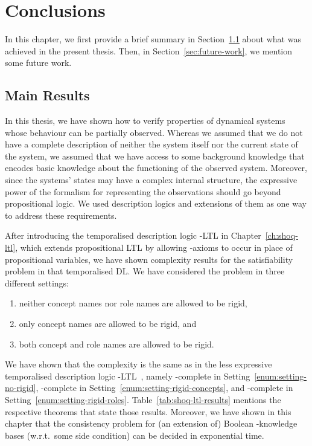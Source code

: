 \chapter{Conclusions}\label{ch:conclusions}

In this chapter, we first provide a brief summary in
Section~\ref{sec:main-results} about what was achieved in the present
thesis.  Then, in Section~\ref{sec:future-work}, we mention some future work.


\section{Main Results}\label{sec:main-results}

In this thesis, we have shown how to verify properties of dynamical systems
whose behaviour can be partially observed.  Whereas we assumed that we do not
have a complete description of neither the system itself nor the current state
of the system, we assumed that we have access to some background knowledge that
encodes basic knowledge about the functioning of the observed system.  Moreover,
since the systems' states may have a complex internal structure, the expressive
power of the formalism for representing the observations should go beyond
propositional logic.
%
We used description logics and extensions of them as one way to address these
requirements.

After introducing the temporalised description logic \SHOQ-LTL in
Chapter~\ref{ch:shoq-ltl}, which extends propositional LTL by allowing
\SHOQ-axioms to occur in place of propositional variables, we have shown
complexity results for the satisfiability problem in that temporalised DL\@.
We have considered the problem in three different settings:
\begin{enumerate}[label=(\roman*)]
    \item\label{enum:setting-no-rigid}
        neither concept names nor role names are allowed to be rigid,
    \item\label{enum:setting-rigid-concepts}
        only concept names are allowed to be rigid, and
    \item\label{enum:setting-rigid-roles}
        both concept and role names are allowed to be rigid.
\end{enumerate}
We have shown that the complexity is the same as in the less expressive
temporalised description logic \ALC-LTL~\cite{BaGL-ToCL12}, namely
\ExpTime-complete in Setting~\ref{enum:setting-no-rigid}, \NExpTime-complete in
Setting~\ref{enum:setting-rigid-concepts}, and \TwoExpTime-complete in
Setting~\ref{enum:setting-rigid-roles}.  Table~\ref{tab:shoq-ltl-results}
mentions the respective theorems that state those results.  Moreover, we have
shown in this chapter that the consistency problem for (an extension of) Boolean
\SHOQ-knowledge bases (w.r.t.\ some side condition) can be decided in
exponential time.

